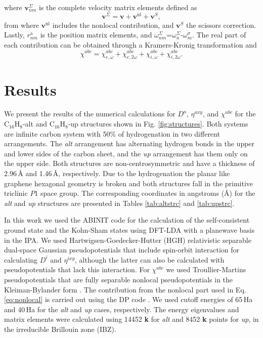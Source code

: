 \documentclass[pss]{wiley2sp} %
\begin{document}
where $\mathbf{v}^{\Sigma}_{nm}$ is the complete velocity matrix elements defined as
\begin{equation*}\label{eq:nonlocal}
\mathbf{v}^{\Sigma}=\mathbf{v}+\mathbf{v}^{\mathrm{nl}}+\mathbf{v}^{S},
\end{equation*}
from where $\mathbf{v}^{\mathrm{nl}}$ includes the nonlocal contribution, and $\mathbf{v}^{S}$ the scissors correction. Lastly, $r^{\mathrm{a}}_{nm}$ is the position matrix elements, and $\omega^\Sigma_{nm}$=$\omega^{\Sigma}_{n}$-$\omega^{\sigma}_{m}$. The real part of each contribution can be obtained through a Kramers-Kronig transformation \cite{tancognePRB14} and
\begin{equation*}\label{eq:chitotal}
    \chi^{abc} = \chi^{abc}_{e,\omega} + \chi^{abc}_{e,2\omega} +
    \chi^{abc}_{i,\omega} + \chi^{abc}_{i,2\omega}
    .
\end{equation*}

\section{Results}\label{sec:results}

We present the results of the numerical calculations for {$D^{a}$}, {$\eta^{axy}$}, and $\chi^{abc}$ for the C$_{16}$H$_{8}$-alt and C$_{16}$H$_{8}$-up structures shown in Fig. \ref{fig:structures}. Both systems are infinite carbon system with 50\% of hydrogenation in two different arrangements. The \emph{alt} arrangement has alternating hydrogen bonds in the upper and lower sides of the carbon sheet, and the \emph{up} arrangement has them only on the upper side. Both structures are non-centrosymmetric and have a thickness of 2.96\,{\AA} and 1.46\,{\AA}, respectively. Due to the hydrogenation the planar like graphene hexagonal geometry is broken and both structures fall in the primitive triclinic $P1$ space group. The corresponding coordinates in angstroms (\AA) for the \emph{alt} and \emph{up} structures are presented in Tables \ref{tab:altstrc} and \ref{tab:upstrc}.



In this work we used the ABINIT code \cite{torrentCMS08} for the calculation of the self-consistent ground state and the Kohn-Sham states using DFT-LDA with a planewave basis in the IPA. We used Hartwigsen-Goedecker-Hutter (HGH) relativistic separable dual-space Gaussian pseudopotentials \cite{hartwigsenPRB98} that include spin-orbit interaction for calculating $D^{i}$ and {$\eta^{ixy}$}, although the latter can also be calculated with pseudopotentials that lack this interaction. For $\chi^{abc}$ we used Troullier-Martins pseudopotentials \cite{troullierPRB91} that are fully separable nonlocal pseudopotentials in the Kleiman-Bylander form \cite{kleinmanPRL82}. The contribution from the nonlocal part used in Eq. \eqref{eq:nonlocal} is carried out using the DP code \cite{olevanoDP}. We used cutoff energies of 65\,Ha and 40\,Ha for the \emph{alt} and \emph{up} cases, respectively. The energy eigenvalues and matrix elements were calculated using 14452 \textbf{k} for \emph{alt} and 8452 \textbf{k} points for \emph{up}, in the irreducible Brillouin zone (IBZ).
\end{document}

